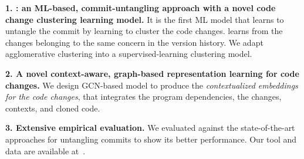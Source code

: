 {\bf 1. {\tool}: an ML-based, commit-untangling approach with a novel
  code change clustering learning model.} It is the first ML model
that learns to untangle the commit by learning to cluster the code
changes.  {\tool} learns from the changes belonging to the same
concern in the version history. We adapt agglomerative clustering
into a supervised-learning clustering model.

{\bf 2. A novel context-aware, graph-based representation learning for
  code changes.} We design GCN-based model to produce the {\em
  contextualized embeddings for the code changes}, that
integrates the program dependencies, the changes, contexts, and cloned code.

{\bf 3. Extensive empirical evaluation.} We evaluated {\tool} against
the state-of-the-art approaches for untangling commits to show its better
performance. Our tool and data are available at~\cite{utango-website}.


